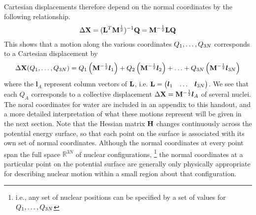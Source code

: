 \documentclass[11pt]{article}
\begin{document}
Cartesian displacements therefore depend on the normal coordinates by the
following relationship.
\begin{align*}
    \Delta\mathbf{X}
=
    (\mathbf{L}^T\mathbf{M}^{\frac{1}{2}})^{-1}\mathbf{Q}
=
    \mathbf{M}^{-\frac{1}{2}}\mathbf{L}\mathbf{Q}
\end{align*}
This shows that a motion along the various coordinates $Q_1,\ldots,Q_{3N}$
corresponds to a Cartesian displacement by
\begin{align}
    \Delta\mathbf{X}(Q_1,\ldots,Q_{3N})
=
    Q_1\left(\mathbf{M}^{-\frac{1}{2}}\bm{l}_1\right)
+
    Q_2\left(\mathbf{M}^{-\frac{1}{2}}\bm{l}_2\right)
+
    \ldots
+
    Q_{3N}\left(\mathbf{M}^{-\frac{1}{2}}\bm{l}_{3N}\right)
\end{align}
where the $\bm{l}_A$ represent column vectors of $\mathbf{L}$, i.e.
$\mathbf{L}=\left(\begin{matrix}\bm{l}_1&\ldots&\bm{l}_{3N}\end{matrix}\right)$. We see that each $Q_A$ corresponds to a
collective displacement $\Delta\mathbf{X}=\mathbf{M}^{-\frac{1}{2}}\bm{l}_A$ of several
nuclei. The noral coordinates for water are included in an appendix to this
handout, and a more detailed interpretation of what these motions represent
will be given in the next section. Note that the Hessian matrix $\mathbf{H}$
changes continuously across the potential energy surface, so that each point on
the surface is associated with its own set of normal coordinates. Although the
normal coordinates at every point span the full space $\mathbb{R}^{3N}$ of
nuclear configurations, \footnote{i.e., any set of nuclear positions can be
specified by a set of values for $Q_1,\ldots,Q_{3N}$} the normal coordinates at a
particular point on the potential surface are generally only physically
appropriate for describing nuclear motion within a small region about that
configuration.
\end{document}
